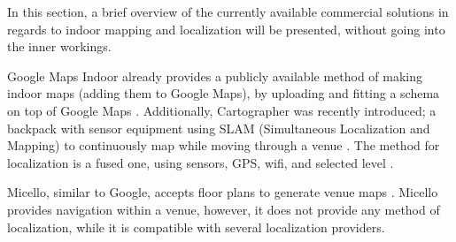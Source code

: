 In this section, a brief overview of the currently available commercial solutions in regards to indoor mapping and localization will be presented, without going into the inner workings.

Google Maps Indoor already provides a publicly available method of making indoor maps (adding them to Google Maps), by uploading and fitting a schema on top of Google Maps \cite{google_maps_indoor}.
Additionally, Cartographer was recently introduced; a backpack with sensor equipment using SLAM (Simultaneous Localization and Mapping) to continuously map while moving through a venue \cite{cartographer}.
The method for localization is a fused one, using sensors, GPS, wifi, and selected level \cite[Slide 45]{indoor_maps_google_slides}.

Micello, similar to Google, accepts floor plans to generate venue maps \cite{micello}.
Micello provides navigation within a venue, however, it does not provide any method of localization, while it is compatible with several localization providers.


